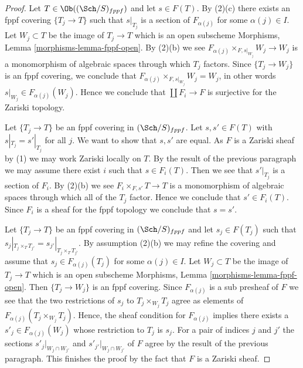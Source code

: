 \begin{proof}
Let $T \in \Ob((\Sch/S)_{fppf})$ and let $s \in F(T)$. By (2)(c)
there exists an fppf covering $\{T_j \to T\}$ such that
$s|_{T_j}$ is a section of $F_{\alpha(j)}$ for some $\alpha(j) \in I$.
Let $W_j \subset T$ be the image of $T_j \to T$
which is an open subscheme Morphisms, Lemma \ref{morphisms-lemma-fppf-open}.
By (2)(b) we see
$F_{\alpha(j)} \times_{F, s|_{W_j}} W_j \to W_j$ is a monomorphism
of algebraic spaces through which $T_j$ factors. Since $\{T_j \to W_j\}$
is an fppf covering, we conclude that
$F_{\alpha(j)} \times_{F, s|_{W_j}} W_j = W_j$, in other words
$s|_{W_j} \in F_{\alpha(j)}(W_j)$. Hence we conclude that
$\coprod F_i \to F$ is surjective for the Zariski topology.

\medskip\noindent
Let $\{T_j \to T\}$ be an fppf covering in $(\Sch/S)_{fppf}$.
Let $s, s' \in F(T)$ with $s|_{T_j} = s'|_{T_j}$ for all $j$.
We want to show that $s, s'$ are equal. As $F$ is a Zariski sheaf by (1)
we may work Zariski locally on $T$. By the result of the previous paragraph
we may assume there exist $i$ such that $s \in F_i(T)$. Then we see that
$s'|_{T_j}$ is a section of $F_i$. By (2)(b) we see
$F_{i} \times_{F, s'} T \to T$ is a monomorphism of algebraic spaces
through which all of the $T_j$ factor. Hence we conclude that
$s' \in F_i(T)$. Since $F_i$ is a sheaf for the fppf topology
we conclude that $s = s'$.

\medskip\noindent
Let $\{T_j \to T\}$ be an fppf covering in $(\Sch/S)_{fppf}$ and let
$s_j \in F(T_j)$ such that
$s_j|_{T_j \times_T T_{j'}} = s_{j'}|_{T_j \times_T T_{j'}}$. By assumption
(2)(b) we may refine the covering and assume that $s_j \in F_{\alpha(j)}(T_j)$
for some $\alpha(j) \in I$. Let $W_j \subset T$ be the image of $T_j \to T$
which is an open subscheme Morphisms, Lemma \ref{morphisms-lemma-fppf-open}.
Then $\{T_j \to W_j\}$ is an fppf covering. Since $F_{\alpha(j)}$ is a sub
presheaf of $F$ we see that the two restrictions of $s_j$ to
$T_j \times_{W_j} T_j$ agree as elements of
$F_{\alpha(j)}(T_j \times_{W_j} T_j)$. Hence, the sheaf condition for
$F_{\alpha(j)}$ implies there exists a $s'_j \in F_{\alpha(j)}(W_j)$
whose restriction to $T_j$ is $s_j$. For a pair of indices
$j$ and $j'$ the sections $s'_j|_{W_j \cap W_{j'}}$ and
$s'_{j'}|_{W_j \cap W_{j'}}$ of $F$ agree by the result of the
previous paragraph. This finishes the proof by the fact that
$F$ is a Zariski sheaf.
\end{proof}





